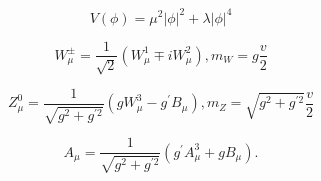 \begin{equation}
V(\phi) = \mu^{2}|\phi|^{2} + \lambda|\phi|^{4}
\end{equation}

\begin{equation}
W_{\mu}^{\pm}=\frac{1}{\sqrt{2}}(W_{\mu}^{1} \mp iW_{\mu}^{2}),                       m_{W}=g\frac{v}{2}
\end{equation}

\begin{equation}
Z_{\mu}^{0}  =\frac{1}{\sqrt{g^{2} + g^{\prime 2}}}(gW_{\mu}^{3} - g^{\prime}B_{\mu}),m_{Z}=\sqrt{g^{2} + g^{\prime 2}}\frac{v}{2}
\end{equation}

\begin{equation}
A_{\mu} = \frac{1}{\sqrt{g^{2} + g^{\prime 2}}}(g^{\prime} A_{\mu}^{3} + gB_{\mu}).
\end{equation}
